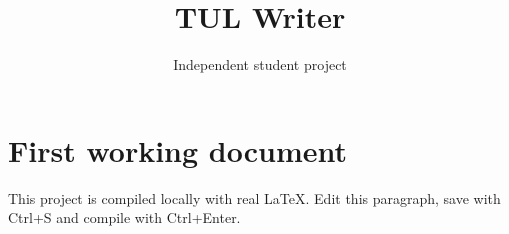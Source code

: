 \documentclass[a4paper,11pt]{article}
\title{TUL Writer}
\author{Independent student project}
\date{}
\begin{document}
\maketitle
\section{First working document}
This project is compiled locally with real LaTeX.
Edit this paragraph, save with Ctrl+S and compile with Ctrl+Enter.

\end{document}
